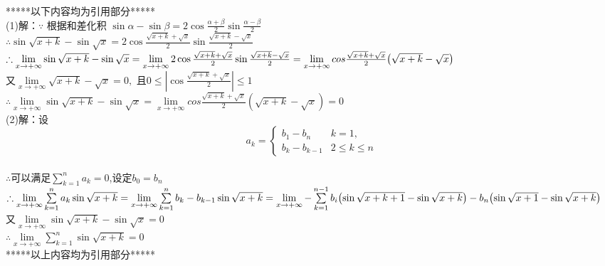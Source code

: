 *****以下内容均为引用部分*****\\
(1)解：$\because$ 根据和差化积 $\sin{\alpha}-\sin{\beta}=2\cos{\frac{\alpha+\beta}{2}}\sin{\frac{\alpha-\beta}{2}}$\\
$\therefore \sin{\sqrt{x+k}}-\sin{\sqrt{x}}=2\cos{\frac{\sqrt{x+k}+\sqrt{x}}{2}}\sin{\frac{\sqrt{x+k}-\sqrt{x}}{2}}$\\
$\therefore \lim\limits_{x \to +\infty}{\sin{\sqrt{x+k}}-\sin{\sqrt{x}}}
=\lim\limits_{x \to +\infty}{2\cos{\frac{\sqrt{x+k}+\sqrt{x}}{2}}\sin{\frac{\sqrt{x+k}-\sqrt{x}}{2}}}\\
=\lim\limits_{x \to +\infty}{cos{\frac{\sqrt{x+k}+\sqrt{x}}{2}}{\left(\sqrt{x+k}-\sqrt{x}\right)}}$\\
又$\lim\limits_{x \to +\infty}{\sqrt{x+k}-\sqrt{x}}=0,$
且$0\leqslant \left| \cos{\frac{\sqrt{x+k}+\sqrt{x}}{2}} \right|\leqslant 1$\\
$\therefore \lim\limits_{x \to +\infty}{\sin{\sqrt{x+k}}-\sin{\sqrt{x}}}
=\lim\limits_{x \to +\infty}{cos{\frac{\sqrt{x+k}+\sqrt{x}}{2}}{\left (\sqrt{x+k}-\sqrt{x}\right)}}=0$\\
(2)解：设
$$a_k=\begin{cases}
b_1-b_n &k=1,\\
b_k-b_{k-1} &2\leqslant k \leqslant n
\end{cases}$$\\
$\therefore$可以满足$\sum\limits_{k=1}^{n}{a_k}=0$,设定$b_0=b_n$\\
$\therefore \lim\limits_{x\to+\infty}{\sum\limits_{k=1}^{n}{{a_k}\sin{\sqrt{x+k}}}}
=\lim\limits_{x\to+\infty}{\sum\limits_{k=1}^{n}{{b_k-b_{k-1}}\sin{\sqrt{x+k}}}}\\
=\lim\limits_{x\to+\infty}{-\sum\limits_{k=1}^{n-1}{b_i{\left( \sin{\sqrt{x+k+1}}-\sin{\sqrt{x+k}} \right)}}-b_n{\left( \sin{\sqrt{x+1}}-\sin{\sqrt{x+k}} \right)}}$\\
又$\lim\limits_{x\to +\infty}{\sin{\sqrt{x+k}}-\sin{\sqrt{x}}}=0$\\
$\therefore \lim\limits_{x\to+\infty}{\sum\limits_{k=1}^{n}{\sin{\sqrt{x+k}}}}=0$\\
*****以上内容均为引用部分*****\\